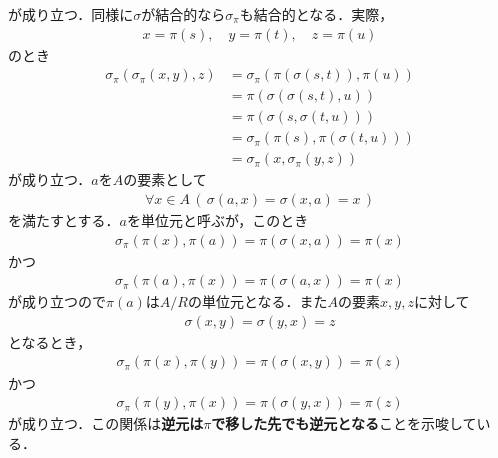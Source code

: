 	が成り立つ．同様に$\sigma$が結合的なら$\sigma_\pi$も結合的となる．実際，
	\begin{align}
		x = \pi(s),\quad y = \pi(t),\quad z = \pi(u)
	\end{align}
	のとき
	\begin{align}
		\sigma_\pi\left(\sigma_\pi(x,y),z\right)
		&= \sigma_\pi\left(\pi(\sigma(s,t)),\pi(u)\right) \\
		&= \pi\left(\sigma(\sigma(s,t),u)\right) \\
		&= \pi\left(\sigma(s,\sigma(t,u))\right) \\
		&= \sigma_\pi\left(\pi(s),\pi(\sigma(t,u))\right) \\
		&= \sigma_\pi\left(x,\sigma_\pi(y,z)\right)
	\end{align}
	が成り立つ．$a$を$A$の要素として
	\begin{align}
		\forall x \in A\, (\, \sigma(a,x) = \sigma(x,a) = x\, )
	\end{align}
	を満たすとする．$a$を単位元と呼ぶが，このとき
	\begin{align}
		\sigma_\pi(\pi(x),\pi(a)) = \pi(\sigma(x,a)) = \pi(x)
	\end{align}
	かつ
	\begin{align}
		\sigma_\pi(\pi(a),\pi(x)) = \pi(\sigma(a,x)) = \pi(x)
	\end{align}
	が成り立つので$\pi(a)$は$A/R$の単位元となる．また$A$の要素$x,y,z$に対して
	\begin{align}
		\sigma(x,y) = \sigma(y,x) = z
	\end{align}
	となるとき，
	\begin{align}
		\sigma_\pi(\pi(x),\pi(y)) = \pi(\sigma(x,y)) = \pi(z)
	\end{align}
	かつ
	\begin{align}
		\sigma_\pi(\pi(y),\pi(x)) = \pi(\sigma(y,x)) = \pi(z)
	\end{align}
	が成り立つ．この関係は{\bf 逆元は$\pi$で移した先でも逆元となる}ことを示唆している．
	
